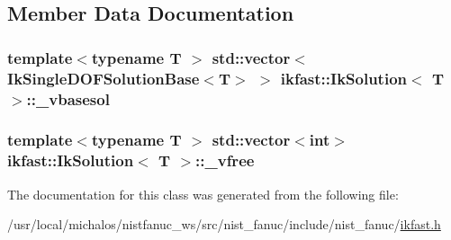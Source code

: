 \subsection{Member Data Documentation}
\hypertarget{classikfast_1_1IkSolution_a823a44ea0a199929967ce1646792a50c}{
\subsubsection[{\-\_\-vbasesol}]{\setlength{\rightskip}{0pt plus 5cm}template$<$typename T $>$ std\-::vector$<${\bf Ik\-Single\-D\-O\-F\-Solution\-Base}$<$T$>$ $>$ {\bf ikfast\-::\-Ik\-Solution}$<$ T $>$\-::\-\_\-vbasesol}}\label{classikfast_1_1IkSolution_a823a44ea0a199929967ce1646792a50c}
\hypertarget{classikfast_1_1IkSolution_a3c552543a66e39e127bed5a5c085b1bb}{
\subsubsection[{\-\_\-vfree}]{\setlength{\rightskip}{0pt plus 5cm}template$<$typename T $>$ std\-::vector$<$int$>$ {\bf ikfast\-::\-Ik\-Solution}$<$ T $>$\-::\-\_\-vfree}}\label{classikfast_1_1IkSolution_a3c552543a66e39e127bed5a5c085b1bb}


The documentation for this class was generated from the following file\-:\begin{DoxyCompactItemize}
\item 
/usr/local/michalos/nistfanuc\-\_\-ws/src/nist\-\_\-fanuc/include/nist\-\_\-fanuc/\hyperlink{ikfast_8h}{ikfast.\-h}\end{DoxyCompactItemize}
